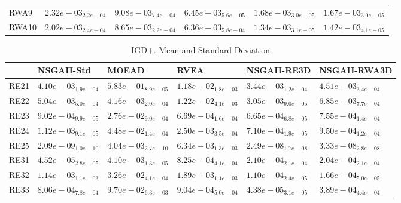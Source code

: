 \documentclass{article}
\begin{document}
\begin{table}
\begin{scriptsize}
\begin{tabular}{llllll}
RWA9 & $  2.32e-03_{ 2.2e-04}$ & $  9.08e-03_{ 7.4e-04}$ & $  6.45e-03_{ 5.6e-05}$ & \cellcolor{gray25}$  1.68e-03_{ 3.0e-05}$ & \cellcolor{gray95}$  1.67e-03_{ 3.0e-05}$ \\
RWA10 & $  2.02e-03_{ 2.4e-04}$ & $  8.65e-03_{ 2.2e-04}$ & $  6.36e-03_{ 5.8e-04}$ & \cellcolor{gray95}$  1.34e-03_{ 3.1e-05}$ & \cellcolor{gray25}$  1.42e-03_{ 4.1e-05}$ \\
\hline
\end{tabular}
\end{scriptsize}
\end{table}

\begin{table}
\caption{IGD+. Mean and Standard Deviation}
\label{table: IGD+}
\centering
\begin{scriptsize}
\begin{tabular}{llllll}
\hline & NSGAII-Std & MOEAD & RVEA & NSGAII-RE3D &  NSGAII-RWA3D\\
\hline 
RE21 & \cellcolor{gray25}$  4.10e-03_{ 1.9e-04}$ & $  5.83e-01_{ 8.9e-05}$ & $  1.18e-02_{ 1.8e-03}$ & \cellcolor{gray95}$  3.44e-03_{ 1.2e-04}$ & $  4.51e-03_{ 3.4e-04}$ \\
RE22 & $  5.04e-03_{ 5.0e-04}$ & \cellcolor{gray25}$  4.16e-03_{ 2.0e-04}$ & $  1.22e-02_{ 4.1e-03}$ & \cellcolor{gray95}$  3.05e-03_{ 9.0e-05}$ & $  6.85e-03_{ 7.7e-04}$ \\
RE23 & $  9.02e-04_{ 9.9e-05}$ & $  2.76e-02_{ 9.0e-04}$ & \cellcolor{gray25}$  6.69e-04_{ 1.6e-04}$ & \cellcolor{gray95}$  6.65e-04_{ 6.8e-05}$ & $  7.55e-04_{ 1.4e-04}$ \\
RE24 & $  1.12e-03_{ 9.1e-05}$ & $  4.48e-02_{ 1.4e-04}$ & $  2.50e-03_{ 3.5e-04}$ & \cellcolor{gray95}$  7.10e-04_{ 1.9e-05}$ & \cellcolor{gray25}$  9.50e-04_{ 1.2e-04}$ \\
RE25 & \cellcolor{gray95}$  2.09e-09_{ 1.0e-10}$ & $  4.04e-03_{ 2.7e-10}$ & $  6.34e-03_{ 1.3e-03}$ & \cellcolor{gray25}$  2.49e-08_{ 1.7e-08}$ & $  3.33e-08_{ 2.8e-08}$ \\
RE31 & \cellcolor{gray95}$  4.52e-05_{ 2.8e-05}$ & $  4.10e-03_{ 1.3e-05}$ & $  8.25e-04_{ 4.1e-04}$ & $  2.10e-04_{ 2.1e-04}$ & \cellcolor{gray25}$  2.04e-04_{ 2.1e-04}$ \\
RE32 & $  1.14e-03_{ 1.1e-03}$ & $  3.26e-02_{ 4.1e-04}$ & $  1.89e-03_{ 1.1e-03}$ & \cellcolor{gray95}$  1.10e-04_{ 2.4e-05}$ & \cellcolor{gray25}$  1.66e-04_{ 5.0e-05}$ \\
RE33 & $  8.06e-04_{ 7.8e-04}$ & $  9.70e-02_{ 6.3e-03}$ & $  9.04e-04_{ 5.0e-04}$ & \cellcolor{gray95}$  4.38e-05_{ 3.1e-05}$ & \cellcolor{gray25}$  3.89e-04_{ 4.4e-04}$ \\

\end{tabular}
\end{scriptsize}
\end{table}
\end{document}
